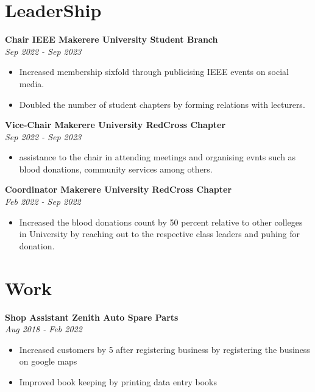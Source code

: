 \documentclass[a4paper]{article}
\begin{document}
    \begin{minipage}[t]{0.5\textwidth}
        \section*{\bf LeaderShip}
        {\bf Chair IEEE Makerere University Student Branch}\\
        \hfil{\em Sep 2022 - Sep 2023}
        \begin{itemize}
            \itemsep0em
            \item Increased membership sixfold through publicising IEEE events on social media.
            \item Doubled the number of student chapters by forming relations with lecturers.
        \end{itemize}


        {\bf Vice-Chair Makerere University RedCross Chapter}\\
        \hfil{\em Sep 2022 - Sep 2023}
        \begin{itemize}
            \itemsep0em
            \item assistance to the chair in attending meetings and organising evnts such as blood donations, community services among others.
        \end{itemize}

        {\bf Coordinator Makerere University RedCross Chapter}\\
        \hfil{\em Feb 2022 - Sep 2022}
        \begin{itemize}
            \itemsep0em
            \item Increased the blood donations count by 50 percent relative to other colleges in University by reaching out to the respective class leaders and puhing for donation.
        \end{itemize}

        \section*{\bf Work}
        {\bf Shop Assistant Zenith Auto Spare Parts}\\
        \hfil{\em Aug 2018 - Feb 2022}
        \begin{itemize}
            \itemsep0em
            \item Increased customers by 5 after registering business by registering the business on google maps
            \item Improved book keeping by printing data entry books
        \end{itemize}


\end{minipage}
\end{document}
